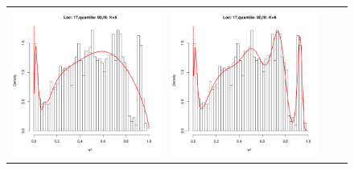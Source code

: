\begin{figure}[h]
\begin{tabular}{cccc}
\includegraphics[width=\textwidth/4]{../img/loc17/quantile90/fit_K5_BFGS.pdf}
&
\includegraphics[width=\textwidth/4]{../img/loc17/quantile90/fit_K6_BFGS.pdf}\\



\end{tabular}
\end{figure}
